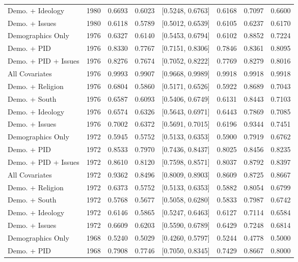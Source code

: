 \begin{longtable}{lrrrlrrr}
  Demo. + Ideology & 1980 & 0.6693 & 0.6023 & [0.5248, 0.6763] & 0.6168 & 0.7097 & 0.6600 \\ 
  Demo. + Issues & 1980 & 0.6118 & 0.5789 & [0.5012, 0.6539] & 0.6105 & 0.6237 & 0.6170 \\ 
  Demographics Only & 1976 & 0.6327 & 0.6140 & [0.5453, 0.6794] & 0.6102 & 0.8852 & 0.7224 \\ 
  Demo. + PID & 1976 & 0.8330 & 0.7767 & [0.7151, 0.8306] & 0.7846 & 0.8361 & 0.8095 \\ 
  Demo. + PID + Issues & 1976 & 0.8276 & 0.7674 & [0.7052, 0.8222] & 0.7769 & 0.8279 & 0.8016 \\ 
  All Covariates & 1976 & 0.9993 & 0.9907 & [0.9668, 0.9989] & 0.9918 & 0.9918 & 0.9918 \\ 
  Demo. + Religion & 1976 & 0.6804 & 0.5860 & [0.5171, 0.6526] & 0.5922 & 0.8689 & 0.7043 \\ 
  Demo. + South & 1976 & 0.6587 & 0.6093 & [0.5406, 0.6749] & 0.6131 & 0.8443 & 0.7103 \\ 
  Demo. + Ideology & 1976 & 0.6574 & 0.6326 & [0.5643, 0.6971] & 0.6443 & 0.7869 & 0.7085 \\ 
  Demo. + Issues & 1976 & 0.7002 & 0.6372 & [0.5691, 0.7015] & 0.6196 & 0.9344 & 0.7451 \\ 
  Demographics Only & 1972 & 0.5945 & 0.5752 & [0.5133, 0.6353] & 0.5900 & 0.7919 & 0.6762 \\ 
  Demo. + PID & 1972 & 0.8533 & 0.7970 & [0.7436, 0.8437] & 0.8025 & 0.8456 & 0.8235 \\ 
  Demo. + PID + Issues & 1972 & 0.8610 & 0.8120 & [0.7598, 0.8571] & 0.8037 & 0.8792 & 0.8397 \\ 
  All Covariates & 1972 & 0.9362 & 0.8496 & [0.8009, 0.8903] & 0.8609 & 0.8725 & 0.8667 \\ 
  Demo. + Religion & 1972 & 0.6373 & 0.5752 & [0.5133, 0.6353] & 0.5882 & 0.8054 & 0.6799 \\ 
  Demo. + South & 1972 & 0.5768 & 0.5677 & [0.5058, 0.6280] & 0.5833 & 0.7987 & 0.6742 \\ 
  Demo. + Ideology & 1972 & 0.6146 & 0.5865 & [0.5247, 0.6463] & 0.6127 & 0.7114 & 0.6584 \\ 
  Demo. + Issues & 1972 & 0.6609 & 0.6203 & [0.5590, 0.6789] & 0.6429 & 0.7248 & 0.6814 \\ 
  Demographics Only & 1968 & 0.5240 & 0.5029 & [0.4260, 0.5797] & 0.5244 & 0.4778 & 0.5000 \\ 
  Demo. + PID & 1968 & 0.7908 & 0.7746 & [0.7050, 0.8345] & 0.7429 & 0.8667 & 0.8000 \\ 

\end{longtable}
